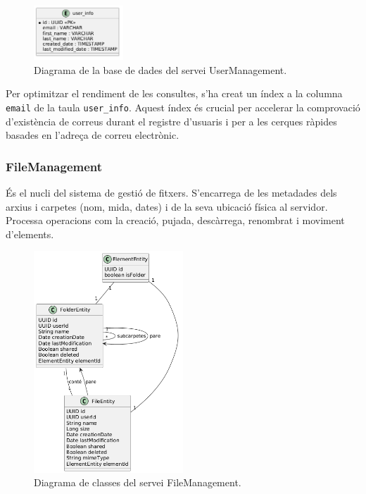 \begin{figure}[H]
    \centering
    \includegraphics[width=0.3\textwidth]{Figures/diagrama_bd_userManagement.png}
    \caption{Diagrama de la base de dades del servei UserManagement.}
    \label{fig:usermgmt_db}
\end{figure}

Per optimitzar el rendiment de les consultes, s'ha creat un índex a la columna \texttt{email} de la taula \texttt{user\_info}. Aquest índex és crucial per accelerar la comprovació d'existència de correus durant el registre d'usuaris i per a les cerques ràpides basades en l'adreça de correu electrònic.

\subsubsection{FileManagement}
És el nucli del sistema de gestió de fitxers. S'encarrega de les metadades dels arxius i carpetes (nom, mida, dates) i de la seva ubicació física al servidor. Processa operacions com la creació, pujada, descàrrega, renombrat i moviment d'elements.

\begin{figure}[H]
    \centering
    \includegraphics[width=0.5\textwidth]{Figures/diagrama_clases_filemanager.png}
    \caption{Diagrama de classes del servei FileManagement.}
    \label{fig:filemgmt_classes}
\end{figure}

